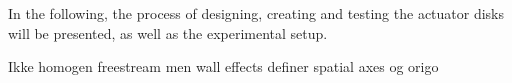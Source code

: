 
In the following, the process of designing, creating and testing the actuator disks will be presented, as well as the experimental setup. 

Ikke homogen freestream men wall effects 
definer spatial axes og origo 














